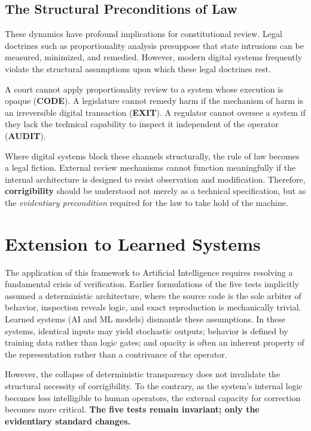 \documentclass{article}
\begin{document}
\subsection{The Structural Preconditions of Law}

These dynamics have profound implications for constitutional review. Legal doctrines such as proportionality analysis presuppose that state intrusions can be measured, minimized, and remedied. However, modern digital systems frequently violate the structural assumptions upon which these legal doctrines rest.

A court cannot apply proportionality review to a system whose execution is opaque (\textbf{CODE}). A legislature cannot remedy harm if the mechanism of harm is an irreversible digital transaction (\textbf{EXIT}). A regulator cannot oversee a system if they lack the technical capability to inspect it independent of the operator (\textbf{AUDIT}).

Where digital systems block these channels structurally, the rule of law becomes a legal fiction. External review mechanisms cannot function meaningfully if the internal architecture is designed to resist observation and modification. Therefore, \textbf{corrigibility} should be understood not merely as a technical specification, but as the \textit{evidentiary precondition} required for the law to take hold of the machine.

\section{Extension to Learned Systems}
\label{sec:learned}

The application of this framework to Artificial Intelligence requires resolving a fundamental crisis of verification. Earlier formulations of the five tests implicitly assumed a deterministic architecture, where the source code is the sole arbiter of behavior, inspection reveals logic, and exact reproduction is mechanically trivial. Learned systems (AI and ML models) dismantle these assumptions. In these systems, identical inputs may yield stochastic outputs; behavior is defined by training data rather than logic gates; and opacity is often an inherent property of the representation rather than a contrivance of the operator.

However, the collapse of deterministic transparency does not invalidate the structural necessity of corrigibility. To the contrary, as the system's internal logic becomes less intelligible to human operators, the external capacity for correction becomes more critical. \textbf{The five tests remain invariant; only the evidentiary standard changes.}
\end{document}
